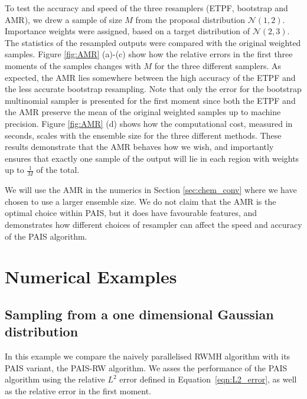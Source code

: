 \documentclass[final]{siamltex}
\begin{document}
To test the accuracy and speed of the three resamplers (ETPF,
bootstrap and AMR), we drew a sample of size $M$ from the proposal distribution
$\mathcal{N}(1,2)$. Importance weights were assigned, based on a
target distribution of $\mathcal{N}(2,3)$. The statistics of the
resampled outputs were compared with the original weighted samples. Figure \ref{fig:AMR} (a)-(c) show how the relative errors in the first
three moments of the samples changes with $M$ for the three different
samplers. As expected, the AMR lies somewhere between the high
accuracy of the ETPF and the less accurate bootstrap
resampling. Note that only the error for the bootstrap multinomial
sampler is presented for the first moment since both the ETPF and the
AMR preserve the mean of the original weighted samples up to machine precision. Figure \ref{fig:AMR} (d) shows how the computational cost,
measured in seconds, scales with the ensemble size for the three
different methods. These results demonstrate that the AMR behaves how we wish, and
importantly ensures that exactly one sample of the output will lie in
each region with weights up to $\frac{1}{M}$ of the total.

We will use the AMR in the numerics in Section \ref{sec:chem_conv}
where we have chosen to use a larger ensemble size. We do not claim
that the AMR is the optimal choice within PAIS, but it does have
favourable features, and demonstrates how different choices of
resampler can affect the speed and accuracy of the PAIS algorithm.

\section{Numerical Examples}\label{Sec:Num}

\subsection{Sampling from a one dimensional Gaussian distribution}\label{sec:problem 1}

In this example we compare the naively parallelised RWMH algorithm with its
PAIS variant, the PAIS-RW algorithm. We asses the performance of the PAIS algorithm
using the relative $L^2$ error defined in Equation~\ref{eqn:L2_error}, as well as the
relative error in the first moment.
\end{document}
